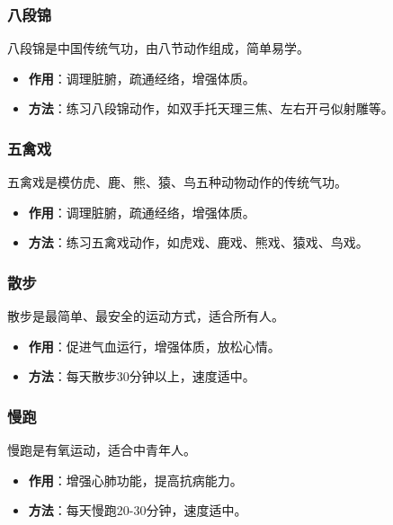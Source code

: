 \documentclass[12pt,UTF8]{ctexbook}
\begin{document}
\subsubsection{八段锦}

八段锦是中国传统气功，由八节动作组成，简单易学。

\begin{itemize}
\item \textbf{作用}：调理脏腑，疏通经络，增强体质。
\item \textbf{方法}：练习八段锦动作，如双手托天理三焦、左右开弓似射雕等。
\end{itemize}

\subsubsection{五禽戏}

五禽戏是模仿虎、鹿、熊、猿、鸟五种动物动作的传统气功。

\begin{itemize}
\item \textbf{作用}：调理脏腑，疏通经络，增强体质。
\item \textbf{方法}：练习五禽戏动作，如虎戏、鹿戏、熊戏、猿戏、鸟戏。
\end{itemize}

\subsubsection{散步}

散步是最简单、最安全的运动方式，适合所有人。

\begin{itemize}
\item \textbf{作用}：促进气血运行，增强体质，放松心情。
\item \textbf{方法}：每天散步30分钟以上，速度适中。
\end{itemize}

\subsubsection{慢跑}

慢跑是有氧运动，适合中青年人。

\begin{itemize}
\item \textbf{作用}：增强心肺功能，提高抗病能力。
\item \textbf{方法}：每天慢跑20-30分钟，速度适中。
\end{itemize}
\end{document}
